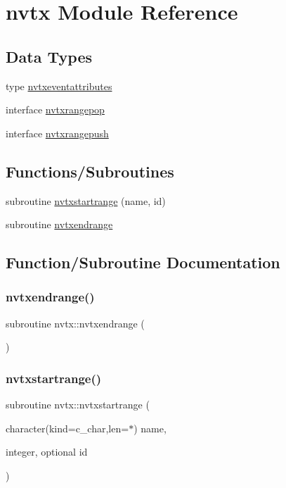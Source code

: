 \hypertarget{namespacenvtx}{}\section{nvtx Module Reference}
\label{namespacenvtx}
\subsection*{Data Types}
\begin{DoxyCompactItemize}
\item 
type \hyperlink{structnvtx_1_1nvtxeventattributes}{nvtxeventattributes}
\item 
interface \hyperlink{interfacenvtx_1_1nvtxrangepop}{nvtxrangepop}
\item 
interface \hyperlink{interfacenvtx_1_1nvtxrangepush}{nvtxrangepush}
\end{DoxyCompactItemize}
\subsection*{Functions/\+Subroutines}
\begin{DoxyCompactItemize}
\item 
subroutine \hyperlink{namespacenvtx_abaf43be3229e42bd0f4c1e75d9670075}{nvtxstartrange} (name, id)
\item 
subroutine \hyperlink{namespacenvtx_aed9b06c5398e0a5b8d7a6e687564fb46}{nvtxendrange}
\end{DoxyCompactItemize}


\subsection{Function/\+Subroutine Documentation}
\mbox{\label{namespacenvtx_aed9b06c5398e0a5b8d7a6e687564fb46}} 
\subsubsection{\texorpdfstring{nvtxendrange()}{nvtxendrange()}}
{\footnotesize\ttfamily subroutine nvtx\+::nvtxendrange (\begin{DoxyParamCaption}{ }\end{DoxyParamCaption})}

\mbox{\label{namespacenvtx_abaf43be3229e42bd0f4c1e75d9670075}} 
\subsubsection{\texorpdfstring{nvtxstartrange()}{nvtxstartrange()}}
{\footnotesize\ttfamily subroutine nvtx\+::nvtxstartrange (\begin{DoxyParamCaption}\item[{character(kind=c\+\_\+char,len=$\ast$)}]{name,  }\item[{integer, optional}]{id }\end{DoxyParamCaption})}

